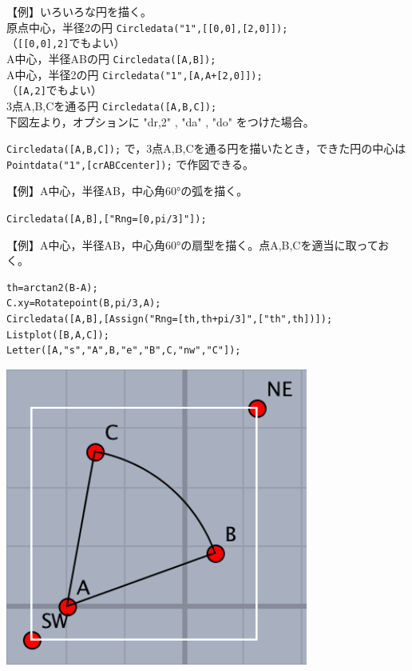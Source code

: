 \documentclass[papersize,a4paper,12pt,uplatex]{jsarticle}
\begin{document}
\begin{description}
\begin{tabbing}
【例】いろいろな円を描く。\\
 \>原点中心，半径2の円\> \verb|Circledata("1",[[0,0],[2,0]]);|\\
  \hspace{50mm}（\verb|[[0,0],2]|でもよい）\\
 \>A中心，半径ABの円\> \verb|Circledata([A,B]);|\\
 \>A中心，半径2の円\> \verb|Circledata("1",[A,A+[2,0]]);|\\
  \hspace{50mm}（\verb|[A,2]|でもよい）\\
 \>3点A,B,Cを通る円\> \verb|Circledata([A,B,C]);|\\
 \>下図左より，オプションに "dr,2" , "da" , "do" をつけた場合。
\end{tabbing}
\hspace{10mm} 
\vspace{\baselineskip}


 \verb|Circledata([A,B,C]);| で，3点A,B,Cを通る円を描いたとき，できた円の中心は \verb|Pointdata("1",[crABCcenter]);| で作図できる。
 
\vspace{\baselineskip}
【例】A中心，半径AB，中心角60°の弧を描く。

\hspace{10mm}\verb|Circledata([A,B],["Rng=[0,pi/3]"]); |

\vspace{\baselineskip}
【例】A中心，半径AB，中心角60°の扇型を描く。点A,B,Cを適当に取っておく。

\begin{verbatim}
th=arctan2(B-A);
C.xy=Rotatepoint(B,pi/3,A);
Circledata([A,B],[Assign("Rng=[th,th+pi/3]",["th",th])]);
Listplot([B,A,C]); 
Letter([A,"s","A",B,"e","B",C,"nw","C"]);
\end{verbatim}

\begin{center}
\includegraphics[bb=0.00 0.00 180.01 177.01,width=4cm"] {Fig/circledata3.pdf}\hspace{12mm}
\end{center}


\end{description}
\end{document}
